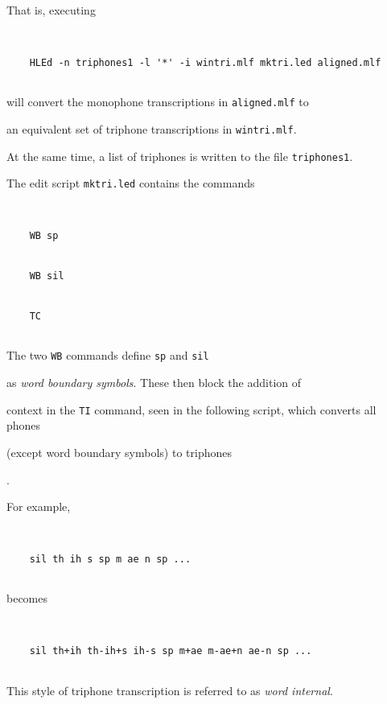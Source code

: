 That is, executing


\begin{verbatim}


    HLEd -n triphones1 -l '*' -i wintri.mlf mktri.led aligned.mlf


\end{verbatim}


will convert the monophone transcriptions in \texttt{aligned.mlf} to


an equivalent set of triphone transcriptions in \texttt{wintri.mlf}.


At the same time, a list of triphones is written to the file \texttt{triphones1}.


The edit script \texttt{mktri.led}  contains the commands


\begin{verbatim}


    WB sp


    WB sil


    TC 


\end{verbatim}


The two \texttt{WB} commands define \texttt{sp} and \texttt{sil}


as \textit{word boundary symbols}.  These then block the addition of


context in the \texttt{TI} command, seen in the following script, which converts all phones


(except word boundary symbols) to triphones


.  


For example,


\begin{verbatim}


    sil th ih s sp m ae n sp ...


\end{verbatim}


becomes


\begin{verbatim}


    sil th+ih th-ih+s ih-s sp m+ae m-ae+n ae-n sp ...


\end{verbatim}


This style of triphone transcription is referred to as \textit{word internal}.





